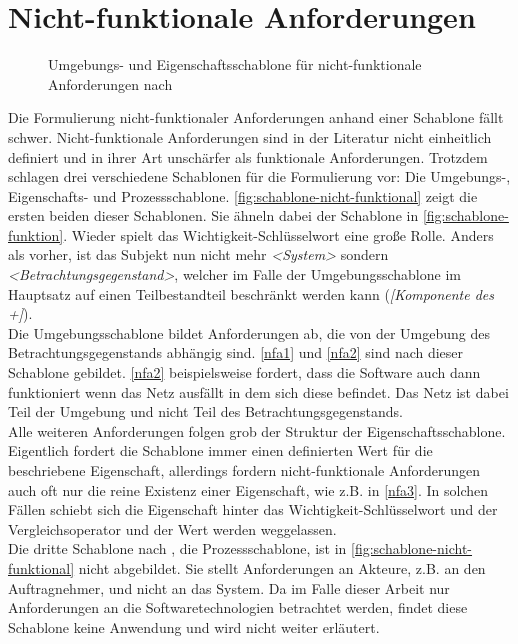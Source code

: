 \section{Nicht-funktionale Anforderungen}
\label{sec:nicht-funktionale}

\begin{figure}
    \centering
    
    
    \caption{Umgebungs- und Eigenschaftsschablone für nicht-funktionale Anforderungen nach }
    \label{fig:schablone-nicht-funktional}
\end{figure}

Die Formulierung nicht-funktionaler Anforderungen anhand einer Schablone fällt schwer. Nicht-funktionale
Anforderungen sind in der Literatur nicht einheitlich definiert und in ihrer Art unschärfer als funktionale
Anforderungen. Trotzdem schlagen  drei verschiedene Schablonen für die Formulierung
vor: Die Umgebungs-, Eigenschafts- und Prozessschablone. \autoref{fig:schablone-nicht-funktional} zeigt
die ersten beiden dieser Schablonen. Sie ähneln dabei der Schablone in \autoref{fig:schablone-funktion}.
Wieder spielt das Wichtigkeit-Schlüsselwort eine große Rolle. Anders als vorher, ist das Subjekt nun 
nicht mehr \emph{<System>} sondern \emph{<Betrachtungsgegenstand>}, welcher im Falle der Umgebungsschablone
im Hauptsatz auf einen Teilbestandteil beschränkt werden kann (\emph{[Komponente des +]}).\\
Die Umgebungsschablone bildet Anforderungen ab, die von der Umgebung 
des Betrachtungsgegenstands abhängig sind. \ref{nfa1} und \ref{nfa2} sind nach dieser Schablone gebildet.
\ref{nfa2} beispielsweise fordert, dass die Software auch dann funktioniert wenn das Netz ausfällt in dem 
sich diese befindet. Das Netz ist dabei Teil der Umgebung und nicht Teil des Betrachtungsgegenstands.\\
Alle weiteren Anforderungen folgen grob der Struktur der Eigenschaftsschablone. Eigentlich fordert die 
Schablone immer einen definierten Wert für die beschriebene Eigenschaft, allerdings fordern nicht-funktionale
Anforderungen auch oft nur die reine Existenz einer Eigenschaft, wie z.B. in \ref{nfa3}.
In solchen Fällen schiebt sich die Eigenschaft hinter das 
Wichtigkeit-Schlüsselwort und der Vergleichsoperator und der Wert werden weggelassen.\\
Die dritte Schablone nach , die Prozessschablone, ist in \autoref{fig:schablone-nicht-funktional}
nicht abgebildet. Sie stellt Anforderungen an Akteure, z.B. an den Auftragnehmer, und nicht an das System.
Da im Falle dieser Arbeit nur Anforderungen an die Softwaretechnologien betrachtet werden, findet diese Schablone 
keine Anwendung und wird nicht weiter erläutert.\\

